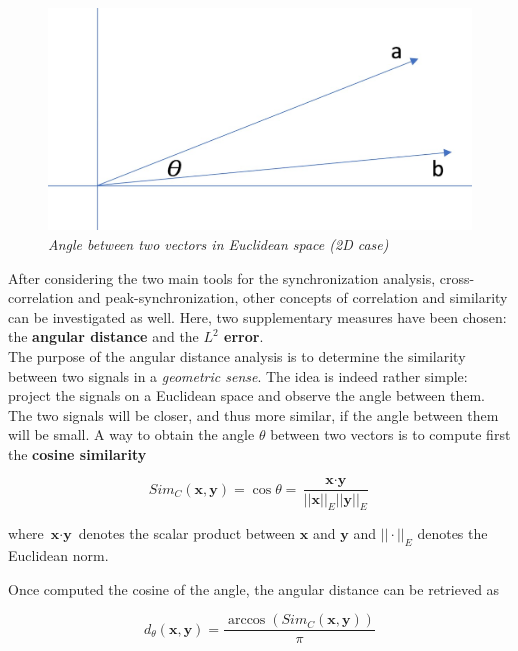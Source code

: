 \documentclass[a4paper]{article}
\begin{document}
\begin{figure}[H]
	\begin{center}
		\hspace*{-3.5cm}
		\includegraphics[scale=.20]{cos_sim.jpg} 
	\end{center} 
	\caption{\textit{Angle between two vectors in Euclidean space (2D case)}}
	
\end{figure}

After considering the two main tools for the synchronization analysis, cross-correlation and peak-synchronization, other concepts of correlation and similarity can be investigated as well. Here, two supplementary measures have been chosen: the \textbf{angular distance} and the \textbf{$L^2$ error}.
\\

The purpose of the angular distance analysis is to determine the similarity between two signals in a \textit{geometric sense}. The idea is indeed rather simple: project the signals on a Euclidean space and observe the angle between them. The two signals will be closer, and thus more similar, if the angle between them will be small.
A way to obtain the angle $\theta$ between two vectors is to compute first the \textbf{cosine similarity}

	$$ Sim_C(\textbf{x},\textbf{y}) = \cos \theta =  \frac{\textbf{x} \cdot \textbf{y}}{||\textbf{x}||_E ||\textbf{y}||_E} $$
	
	where $\textbf{x} \cdot \textbf{y}$ denotes the scalar product between $\textbf{x}$ and $\textbf{y}$ and $ ||\cdot||_E$ denotes the Euclidean norm.
	
	Once computed the cosine of the angle, the angular distance can be retrieved as
	
		$$ d_\theta (\textbf{x},\textbf{y}) = \frac{\arccos(Sim_C(\textbf{x},\textbf{y}))}{\pi} $$
		
\end{document}
